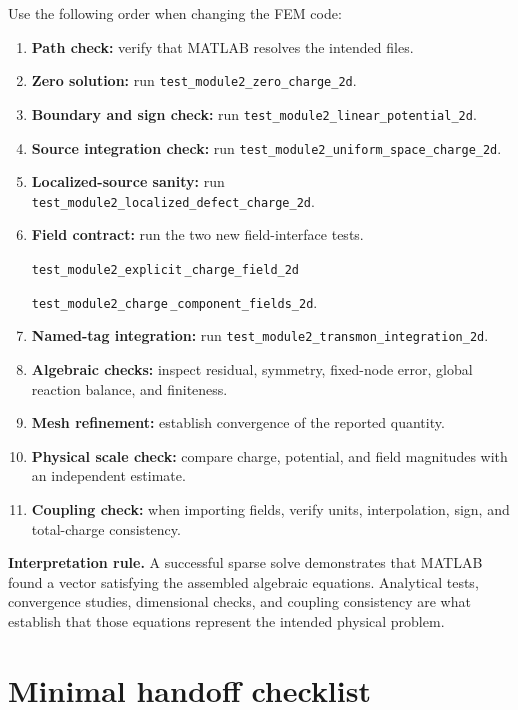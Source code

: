 \documentclass[11pt]{article}
\begin{document}
Use the following order when changing the FEM code:
\begin{enumerate}[leftmargin=*]
  \item \textbf{Path check:} verify that MATLAB resolves the intended files.
  \item \textbf{Zero solution:} run \texttt{test\_module2\_zero\_charge\_2d}.
  \item \textbf{Boundary and sign check:} run \texttt{test\_module2\_linear\_potential\_2d}.
  \item \textbf{Source integration check:} run \texttt{test\_module2\_uniform\_space\_charge\_2d}.
  \item \textbf{Localized-source sanity:} run \texttt{test\_module2\_localized\_defect\_charge\_2d}.
  \item \textbf{Field contract:} run the two new field-interface tests.\par
  {\small\texttt{test\_module2\_explicit}\,\texttt{\_charge\_field\_2d}}\par
  {\small\texttt{test\_module2\_charge}\,\texttt{\_component\_fields\_2d}}.
  \item \textbf{Named-tag integration:} run \texttt{test\_module2\_transmon\_integration\_2d}.
  \item \textbf{Algebraic checks:} inspect residual, symmetry, fixed-node error, global reaction balance, and finiteness.
  \item \textbf{Mesh refinement:} establish convergence of the reported quantity.
  \item \textbf{Physical scale check:} compare charge, potential, and field magnitudes with an independent estimate.
  \item \textbf{Coupling check:} when importing fields, verify units, interpolation, sign, and total-charge consistency.
\end{enumerate}

\begin{physicsbox}
\textbf{Interpretation rule.} A successful sparse solve demonstrates that MATLAB found a vector satisfying the assembled algebraic equations. Analytical tests, convergence studies, dimensional checks, and coupling consistency are what establish that those equations represent the intended physical problem.
\end{physicsbox}

\section{Minimal handoff checklist}
\end{document}
